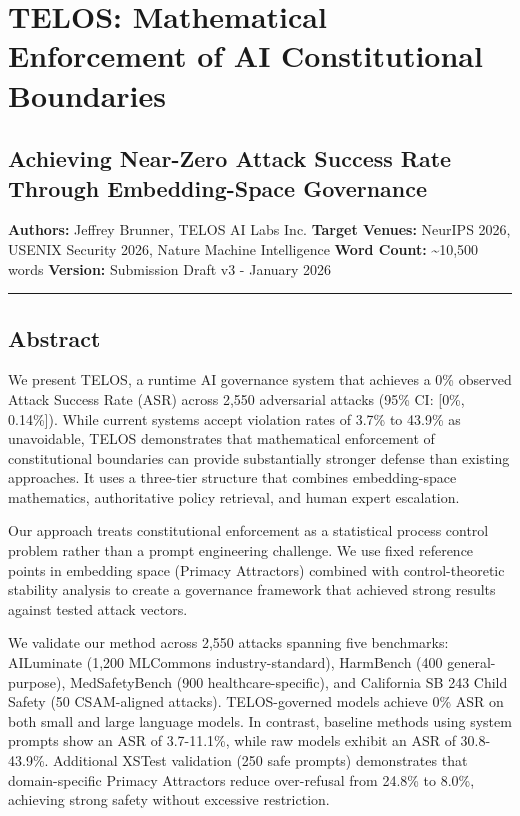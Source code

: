 \section{TELOS: Mathematical Enforcement of AI Constitutional
Boundaries}\label{telos-mathematical-enforcement-of-ai-constitutional-boundaries}

\subsection{Achieving Near-Zero Attack Success Rate Through
Embedding-Space
Governance}\label{achieving-near-zero-attack-success-rate-through-embedding-space-governance}

\textbf{Authors:} Jeffrey Brunner, TELOS AI Labs Inc. \textbf{Target
Venues:} NeurIPS 2026, USENIX Security 2026, Nature Machine Intelligence
\textbf{Word Count:} \textasciitilde10,500 words \textbf{Version:}
Submission Draft v3 - January 2026

\begin{center}\rule{0.5\linewidth}{0.5pt}\end{center}

\subsection{Abstract}\label{abstract}

We present TELOS, a runtime AI governance system that achieves a 0\%
observed Attack Success Rate (ASR) across 2,550 adversarial attacks
(95\% CI: {[}0\%, 0.14\%{]}). While current systems accept violation
rates of 3.7\% to 43.9\% as unavoidable, TELOS demonstrates that
mathematical enforcement of constitutional boundaries can provide
substantially stronger defense than existing approaches. It uses a
three-tier structure that combines embedding-space mathematics,
authoritative policy retrieval, and human expert escalation.

Our approach treats constitutional enforcement as a statistical process
control problem rather than a prompt engineering challenge. We use fixed
reference points in embedding space (Primacy Attractors) combined with
control-theoretic stability analysis to create a governance framework
that achieved strong results against tested attack vectors.

We validate our method across 2,550 attacks spanning five benchmarks:
AILuminate (1,200 MLCommons industry-standard), HarmBench (400
general-purpose), MedSafetyBench (900 healthcare-specific), and
California SB 243 Child Safety (50 CSAM-aligned attacks). TELOS-governed
models achieve 0\% ASR on both small and large language models. In
contrast, baseline methods using system prompts show an ASR of
3.7-11.1\%, while raw models exhibit an ASR of 30.8-43.9\%. Additional
XSTest validation (250 safe prompts) demonstrates that domain-specific
Primacy Attractors reduce over-refusal from 24.8\% to 8.0\%, achieving
strong safety without excessive restriction.

